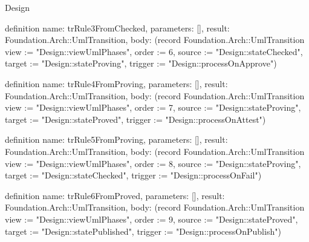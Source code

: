 \begin{lexlean}{Design}
\begin{semanticmodule}
definition{
  name: trRule3FromChecked,
  parameters: [],
  result: Foundation.Arch::UmlTransition,
  body: (record Foundation.Arch::UmlTransition {view := "Design::viewUmlPhases", order := 6, source := "Design::stateChecked", target := "Design::stateProving", trigger := "Design::processOnApprove"})
}

definition{
  name: trRule4FromProving,
  parameters: [],
  result: Foundation.Arch::UmlTransition,
  body: (record Foundation.Arch::UmlTransition {view := "Design::viewUmlPhases", order := 7, source := "Design::stateProving", target := "Design::stateProved", trigger := "Design::processOnAttest"})
}

definition{
  name: trRule5FromProving,
  parameters: [],
  result: Foundation.Arch::UmlTransition,
  body: (record Foundation.Arch::UmlTransition {view := "Design::viewUmlPhases", order := 8, source := "Design::stateProving", target := "Design::stateChecked", trigger := "Design::processOnFail"})
}

definition{
  name: trRule6FromProved,
  parameters: [],
  result: Foundation.Arch::UmlTransition,
  body: (record Foundation.Arch::UmlTransition {view := "Design::viewUmlPhases", order := 9, source := "Design::stateProved", target := "Design::statePublished", trigger := "Design::processOnPublish"})
}
\end{semanticmodule}
\end{lexlean}
